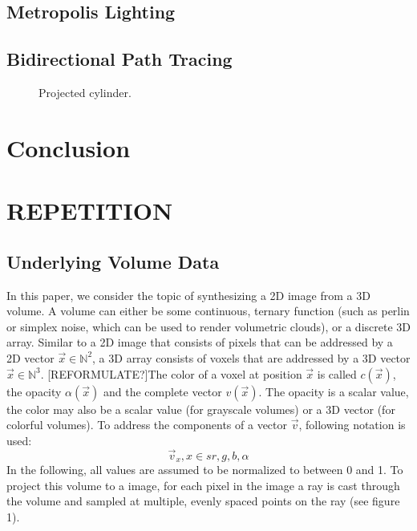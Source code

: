 \subsection{Metropolis Lighting}
\subsection{Bidirectional Path Tracing}
\begin{figure}
\centering
\def\svgwidth{\columnwidth}


  \caption{\label{fig:bidirectional}
         Projected cylinder.}
\end{figure}
\section{Conclusion}
\section{REPETITION}
\subsection{Underlying Volume Data}
In this paper, we consider the topic of synthesizing a 2D image from a 3D volume.
A volume can either be some continuous, ternary function (such as perlin or simplex noise\cite{10.1145/325165.325247}, which can be used to render volumetric clouds\cite{haggstrom2018real}), or a discrete 3D array\cite{511}.
Similar to a 2D image that consists of pixels that can be addressed by a 2D vector $\vec{x} \in \mathbb{N}^2$, a 3D array consists of voxels that are addressed by a 3D vector $\vec{x} \in \mathbb{N}^3$. [REFORMULATE?]The color of a voxel at position $\vec{x}$ is called $c(\vec{x})$, the opacity $\alpha(\vec{x})$ and the complete vector $v(\vec{x})$. The opacity is a scalar value, the color may also be a scalar value (for grayscale volumes) or a 3D vector (for colorful volumes).
To address the components of a vector $\vec{v}$, following notation is used:
\begin{equation}
	\vec{v}_{x}, x \in s{r, g, b, \alpha}
\end{equation}
 In the following, all values are assumed to be normalized to between 0 and 1. To project this volume to a image, for each pixel in the image a ray is cast through the volume and sampled at multiple, evenly spaced points on the ray (see figure 1)\cite{10.1145/78964.78965}.



